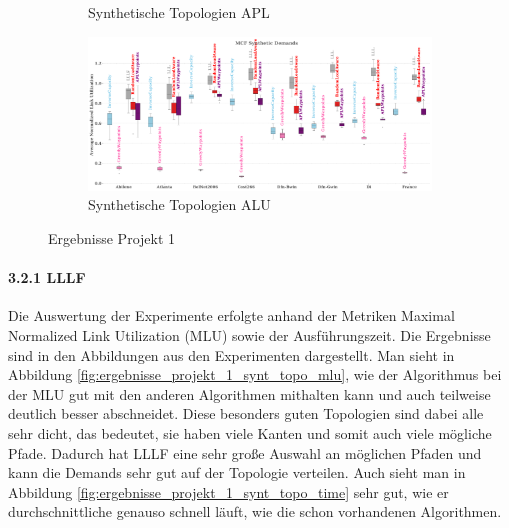 \documentclass[sigconf,nonacm,review,language=english,language=german]{acmart}
\begin{document}
\begin{figure}[h]
\begin{subfigure}{0.49\textwidth}
               \caption{Synthetische Topologien APL}
               \label{fig:ergebnisse_projekt_1_synt_topo_apl}
            \end{subfigure}
            \begin{subfigure}{0.49\textwidth}
                \centering
               \includegraphics[width=1\linewidth]{Grafiken/projekt1/all_topologies_objective_alu_0.pdf}
               \caption{Synthetische Topologien ALU}
               \label{fig:ergebnisse_projekt_1_synt_topo_alu}
            \end{subfigure}
           \caption{Ergebnisse Projekt 1}
           \label{fig:ergebnisse_projekt_1}
        \end{figure}
    
        \paragraph{3.2.1   LLLF}
            Die Auswertung der Experimente erfolgte anhand der Metriken Maximal Normalized Link Utilization (MLU) sowie der Ausführungszeit. Die Ergebnisse sind in den Abbildungen aus den Experimenten dargestellt. Man sieht in Abbildung \ref{fig:ergebnisse_projekt_1_synt_topo_mlu}, wie der Algorithmus bei der MLU gut mit den anderen Algorithmen mithalten kann und auch teilweise deutlich besser abschneidet. Diese besonders guten Topologien sind dabei alle sehr dicht, das bedeutet, sie haben viele Kanten und somit auch viele mögliche Pfade. Dadurch hat LLLF eine sehr große Auswahl an möglichen Pfaden und kann die Demands sehr gut auf der Topologie verteilen. 
            Auch sieht man in Abbildung \ref{fig:ergebnisse_projekt_1_synt_topo_time} sehr gut, wie er durchschnittliche genauso schnell läuft, wie die schon vorhandenen Algorithmen.
        
\end{document}
